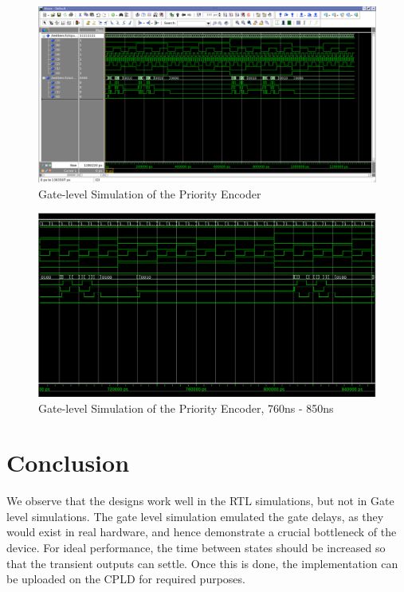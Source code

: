 \documentclass[a4paper, 11pt]{article}
\begin{document}
\begin{figure}[H]
\centering
\includegraphics[scale=0.33]{PE_Gate}
\caption{Gate-level Simulation of the Priority Encoder}
\end{figure}

\begin{figure}[H]
\centering
\includegraphics[scale=0.42]{PE_Gate_Zoomed}
\caption{Gate-level Simulation of the Priority Encoder, 760ns - 850ns}
\end{figure}

\section*{Conclusion}
We observe that the designs work well in the RTL simulations, but not in Gate level simulations. The gate level simulation emulated the gate delays, as they would exist in real hardware, and hence demonstrate a crucial bottleneck of the device. For ideal performance, the time between states should be increased so that the transient outputs can settle. Once this is done, the implementation can be uploaded on the CPLD for required purposes.
\end{document}
